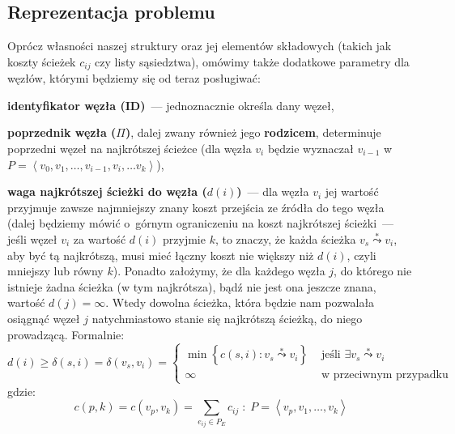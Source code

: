 \subsection{Reprezentacja problemu}
\label{sub:problemRepresentation}



Oprócz własności naszej struktury oraz jej elementów składowych (takich jak koszty ścieżek $c_{ij}$ czy listy sąsiedztwa), omówimy także dodatkowe parametry dla węzłów, którymi będziemy się od teraz posługiwać:

\begin{myitemize}
	\item \textbf{identyfikator węzła (ID)}~--- jednoznacznie określa dany węzeł,
	\item \textbf{poprzednik węzła ($\Pi$)}, dalej zwany również jego \textbf{rodzicem}, determinuje poprzedni węzeł na najkrótszej ścieżce (dla węzła $v_{i}$ będzie wyznaczał $v_{i-1}$ w~$P = \left \langle v_{0}, v_{1}, \dots, v_{i-1}, v_{i}, \dots v_{k} \right \rangle$),
	\item \textbf{waga najkrótszej ścieżki do węzła ($d \left( i \right) $)}~--- dla węzła $v_{i}$ jej wartość przyjmuje zawsze najmniejszy znany koszt przejścia ze źródła do tego węzła (dalej będziemy mówić o~górnym ograniczeniu na koszt najkrótszej ścieżki~--- jeśli węzeł $v_{i}$ za wartość $d \left( i \right)$ przyjmie $k$, to znaczy, że każda ścieżka $v_{s} \overset{*}\leadsto v_{i}$, aby być tą najkrótszą, musi mieć łączny koszt nie większy niż $d \left( i \right)$, czyli mniejszy lub równy $k$).
	Ponadto założymy, że dla każdego węzła $j$, do którego nie istnieje żadna ścieżka (w tym najkrótsza), bądź nie jest ona jeszcze znana, wartość $d \left( j \right) = \infty$.
	Wtedy dowolna ścieżka, która będzie nam pozwalała osiągnąć węzeł $j$ natychmiastowo stanie się najkrótszą ścieżką, do niego prowadzącą.
	Formalnie:
	\begin{equation}
		d \left( i \right) \geqslant \delta \left ( s, i \right ) = \delta \left ( v_{s}, v_{i} \right ) = 
		\begin{cases}
		 \min \left\{ c \left( s,i \right ) : v_{s} \overset{*}\leadsto v_{i} \right\} & \text{ jeśli } \exists v_{s} \overset{*}\leadsto v_{i} \\ 
		 \infty & \text{ w~przeciwnym przypadku }
		\end{cases}
	\end{equation}
	gdzie:
	\begin{equation}\label{eq:sumCost}
		c \left( p,k \right ) = c \left( v_{p}, v_{k} \right ) = \sum_{e_{ij} \in P_{E}} c_{ij} \; : \; P = \left \langle v_{p}, v_{1}, \dots, v_{k} \right \rangle 
	\end{equation}
\end{myitemize}

